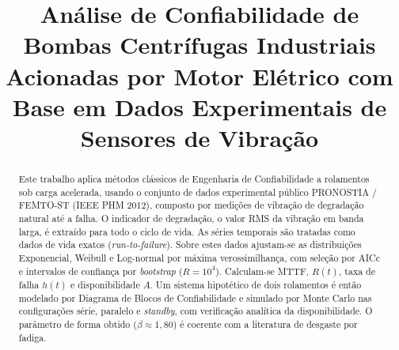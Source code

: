 \documentclass[conference]{IEEEtran}
\begin{document}
\title{Análise de Confiabilidade de Bombas Centrífugas Industriais
       Acionadas por Motor Elétrico com Base em
       Dados Experimentais de Sensores de Vibração}

\author{
\and
{}
\and
{}
}

\maketitle

\begin{abstract}
Este trabalho aplica métodos clássicos de Engenharia de Confiabilidade a rolamentos sob carga acelerada, usando o conjunto de dados experimental público PRONOSTIA / FEMTO-ST (IEEE PHM 2012), composto por medições de vibração de degradação natural até a falha. O indicador de degradação, o valor RMS da vibração em banda larga, é extraído para todo o ciclo de vida. As séries temporais são tratadas como dados de vida exatos (\textit{run-to-failure}). Sobre estes dados ajustam-se as distribuições Exponencial, Weibull e Log-normal por máxima verossimilhança, com seleção por AICc e intervalos de confiança por \textit{bootstrap} ($R=10^4$). Calculam-se MTTF, $R(t)$, taxa de falha $h(t)$ e disponibilidade $A$. Um sistema hipotético de dois rolamentos é então modelado por Diagrama de Blocos de Confiabilidade e simulado por Monte Carlo nas configurações série, paralelo e \textit{standby}, com verificação analítica da disponibilidade. O parâmetro de forma obtido ($\beta \approx 1{,}80$) é coerente com a literatura de desgaste por fadiga.
\end{abstract}
\end{document}
